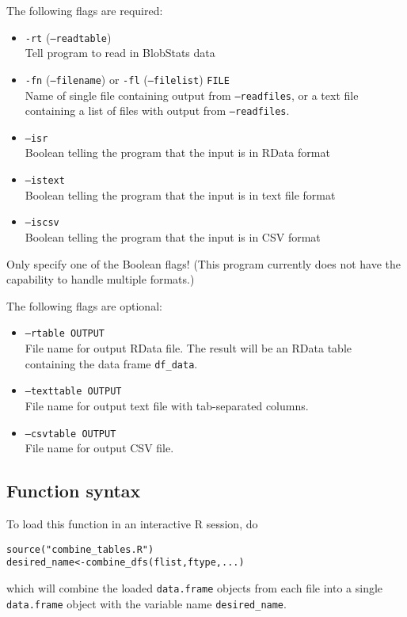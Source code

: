 \documentclass{article}
\begin{document}
The following flags are required:
\begin{itemize}
\item[] \texttt{-rt} (\texttt{--readtable}) \\ Tell program to read in BlobStats data
\item[]\texttt{-fn} (\texttt{--filename}) or \texttt{-fl} (\texttt{--filelist}) \texttt{FILE}\\ Name of single file containing output from \texttt{--readfiles}, or a text file containing a list of files with output from \texttt{--readfiles}.
\item[]\texttt{--isr}\\Boolean telling the program that the input is in RData format
\item[]\texttt{--istext}\\Boolean telling the program that the input is in text file format
\item[] \texttt{--iscsv}\\Boolean telling the program that the input is in CSV format
\end{itemize}

Only specify one of the Boolean flags! (This program currently does not have the capability to handle multiple formats.)

The following flags are optional:
\begin{itemize}
\item[] \texttt{--rtable OUTPUT}\\ File name for output RData file. The result will be an RData table containing the data frame \texttt{df\_data}.
\item[] \texttt{--texttable OUTPUT}\\ File name for output text file with tab-separated columns.
\item[] \texttt{--csvtable OUTPUT}\\File name for output CSV file. 
\end{itemize}


\subsection{Function syntax}
To load this function in an interactive R session, do
\begin{verbatim}
source("combine_tables.R")
desired_name<-combine_dfs(flist,ftype,...)
\end{verbatim}

which will combine the loaded \texttt{data.frame} objects from each file into a single \texttt{data.frame} object with the variable name \texttt{desired\_name}.
\end{document}
